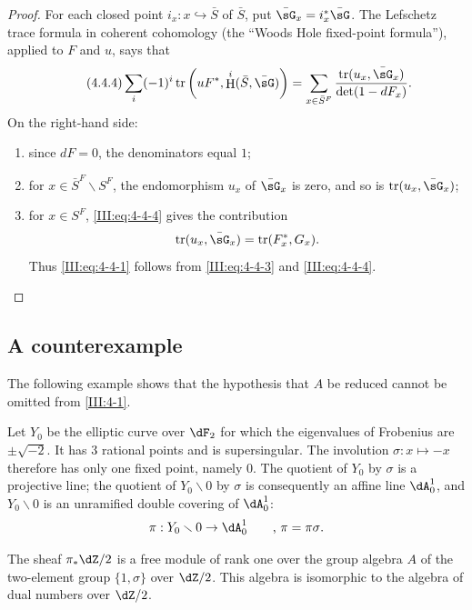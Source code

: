 \documentclass[12pt,oneside,english]{smfbook}
\DeclareMathOperator{\h}{H}
\DeclareMathOperator{\tr}{tr}
\renewcommand{\setminus}{\smallsetminus}
\begin{document}
\begin{proof}
For each closed point $i_x:x\hookrightarrow\bar S$ of $\bar S$, put $\bar\sG_x=i_x^*\bar\sG$. The Lefschetz trace formula in coherent cohomology (the ``Woods Hole fixed-point formula''), applied to $F$ and $u$, says that
\begin{equation*}\tag{4.4.4}\label{III:eq:4-4-4}
  \sum_i (-1)^i \tr\left(u F^*, \h^i(\bar S,\bar\sG)\right)
  = \sum_{x\in \bar S^F}
  \frac{\tr(u_x,\bar\sG_x)}{\det(1-d F_x)} \text{.}
\end{equation*}
On the right-hand side:
\begin{enumerate}[\indent a)]
  \item since $dF=0$, the denominators equal $1$;
  \item for $x\in\bar S^F\setminus S^F$, the endomorphism $u_x$ of $\bar\sG_x$ is zero, and so is $\tr(u_x,\bar\sG_x)$;
  \item for $x\in S^F$, \eqref{III:eq:4-4-4} gives the contribution
    \[
      \tr(u_x,\bar\sG_x) = \tr(F_x^*,G_x) \text{.}
    \]
    Thus \eqref{III:eq:4-4-1} follows from \eqref{III:eq:4-4-3} and \eqref{III:eq:4-4-4}.
\end{enumerate}
\end{proof}

\subsection{A counterexample}\label{III:4-5}

The following example shows that the hypothesis that $A$ be reduced cannot be omitted from \ref{III:4-1}.

Let $Y_0$ be the elliptic curve over $\dF_2$ for which the eigenvalues of Frobenius are $\pm\sqrt{-2}$. It has $3$ rational points and is supersingular. The involution $\sigma:x\mapsto-x$ therefore has only one fixed point, namely $0$. The quotient of $Y_0$ by $\sigma$ is a projective line; the quotient of $Y_0\setminus0$ by $\sigma$ is consequently an affine line $\dA_0^1$, and $Y_0\setminus0$ is an unramified double covering of $\dA_0^1$:
\[
  \pi:Y_0\setminus 0 \to \dA_0^1 \qquad \text{, $\pi=\pi\sigma$.}
\]

The sheaf $\pi_*\dZ/2$ is a free module of rank one over the group algebra $A$ of the two-element group $\{1,\sigma\}$ over $\dZ/2$. This algebra is isomorphic to the algebra of dual numbers over $\dZ/2$.
\end{document}
